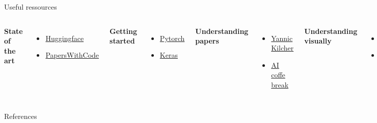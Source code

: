 \documentclass{irdbeamer}
\begin{document}
\begin{frame}{Useful ressources}
\begin{columns}[t]
    \textbf{State of the art}
    \begin{itemize}
        \item \href{https://huggingface.co/}{Huggingface}
        \item \href{https://paperswithcode.com/sota}{PapersWithCode}
    \end{itemize}
    \textbf{Getting started}
    \begin{itemize}
        \item \href{https://docs.pytorch.org/tutorials/}{Pytorch}
        \item \href{https://keras.io/getting_started/}{Keras}
    \end{itemize}
    \textbf{Understanding papers}
    \begin{itemize}
        \item \href{https://www.youtube.com/@YannicKilcher}{Yannic Kilcher}
        \item \href{https://www.youtube.com/@AICoffeeBreak}{AI coffe break}
    \end{itemize}
    \textbf{Understanding visually}
    \begin{itemize}
        \item \href{https://www.youtube.com/@3blue1brown}{3blue1brown}
        \item \href{https://www.youtube.com/@Deepia-ls2fo}{deepia}
    \end{itemize}
\end{columns}

\end{frame}

\begin{frame}[allowframebreaks]{References}
    {\footnotesize \printbibliography[heading=none]}
\end{frame}

    
\end{document}
